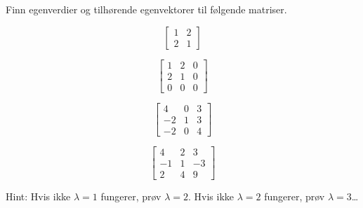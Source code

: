 \begin{oppgave}

Finn egenverdier og tilhørende egenvektorer til følgende matriser.

\begin{punkt}
$$\begin{bmatrix}
1 & 2\\
2 & 1
\end{bmatrix}$$
\end{punkt}

\begin{punkt}
$$\begin{bmatrix}
1 & 2 & 0\\
2 & 1 & 0\\
0 & 0 & 0
\end{bmatrix}$$
\end{punkt}


\begin{punkt}
$$\begin{bmatrix}
4 & 0 & 3\\
-2 & 1 & 3\\
-2 & 0 & 4
\end{bmatrix}$$
\end{punkt}


\begin{punkt}
$$\begin{bmatrix}
4 & 2 & 3\\
-1 & 1 & -3\\
2 & 4 & 9
\end{bmatrix}$$

\noindent
Hint: Hvis ikke $\lambda=1$ fungerer, prøv $\lambda=2$. Hvis ikke $\lambda=2$ fungerer, prøv $\lambda=3$\ldots
\end{punkt}


\end{oppgave}


